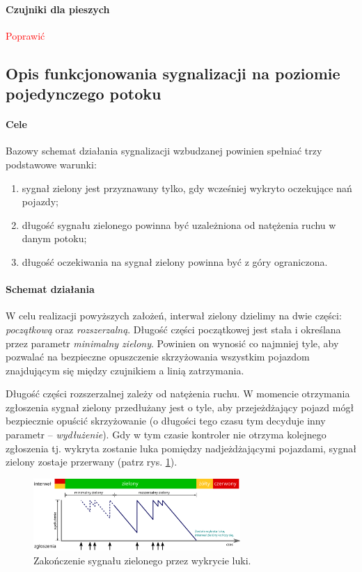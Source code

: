 \documentclass{pracamgr}
\newcommand{\todo}[1]{\textcolor{red}{#1}}
\theoremstyle{plain}
\begin{document}
\paragraph{Czujniki dla pieszych} \todo{Poprawić}

\subsection{Opis funkcjonowania sygnalizacji na poziomie pojedynczego
potoku}
\label{ss:schemat}

\paragraph{Cele} Bazowy schemat działania sygnalizacji wzbudzanej
powinien spełniać trzy podstawowe warunki:
\begin{enumerate}
  \item sygnał zielony jest przyznawany tylko, gdy wcześniej wykryto
oczekujące nań pojazdy;
  \item długość sygnału zielonego powinna być uzależniona od natężenia
ruchu w danym potoku;
  \item długość oczekiwania na sygnał zielony powinna być z góry
ograniczona.
\end{enumerate}

\paragraph{Schemat działania} W celu realizacji powyższych założeń,
interwał zielony dzielimy na dwie części: \emph{początkową} oraz
\emph{rozszerzalną}. Długość części początkowej jest stała i określana
przez parametr \emph{minimalny zielony}. Powinien on wynosić co
najmniej tyle, aby pozwalać na bezpieczne opuszczenie skrzyżowania
wszystkim pojazdom znajdującym się między czujnikiem a linią
zatrzymania.

Długość części rozszerzalnej zależy od natężenia ruchu. W momencie
otrzymania zgłoszenia sygnał zielony przedłużany jest o tyle, aby
przejeżdżający pojazd mógł bezpiecznie opuścić skrzyżowanie (o
długości tego czasu tym decyduje inny parametr --
\emph{wydłużenie}). Gdy w tym czasie kontroler nie otrzyma kolejnego
zgłoszenia tj. wykryta zostanie luka pomiędzy nadjeżdżającymi
pojazdami, sygnał zielony zostaje przerwany (patrz
rys. \ref{img:gap-out}).

\begin{figure}[ht] \centering
  \includegraphics[width=0.7\textwidth]{img/signals-gap-out}
  \caption{Zakończenie sygnału zielonego przez wykrycie luki.}
\label{img:gap-out}
\end{figure}
\end{document}
